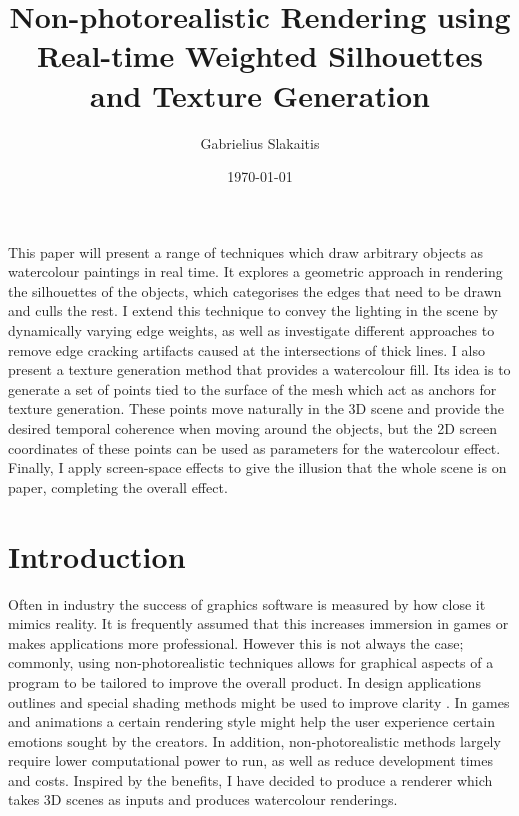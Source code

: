 \documentclass[a4paper, 12pt]{article}
\begin{document}
\title{Non-photorealistic Rendering using Real-time Weighted Silhouettes and Texture Generation}
\author{Gabrielius Slakaitis}
\date{\today}
\maketitle
\newpage

\begin{spacing}{0}
  \tableofcontents
\end{spacing}
\newpage

This paper will present a range of techniques which draw arbitrary objects as watercolour paintings in real time. It explores a geometric approach in rendering the silhouettes of the objects, which categorises the edges that need to be drawn and culls the rest. I extend this technique to convey the lighting in the scene by dynamically varying edge weights, as well as investigate different approaches to remove edge cracking artifacts caused at the intersections of thick lines. I also present a texture generation method that provides a watercolour fill. Its idea is to generate a set of points tied to the surface of the mesh which act as anchors for texture generation. These points move naturally in the 3D scene and provide the desired temporal coherence when moving around the objects, but the 2D screen coordinates of these points can be used as parameters for the watercolour effect. Finally, I apply screen-space effects to give the illusion that the whole scene is on paper, completing the overall effect.



\section{Introduction}

Often in industry the success of graphics software is measured by how close it mimics reality. It is frequently assumed that this increases immersion in games or makes applications more professional. However this is not always the case; commonly, using non-photorealistic techniques allows for graphical aspects of a program to be tailored to improve the overall product. In design applications outlines and special shading methods might be used to improve clarity \cite{Gooch1998}. In games and animations a certain rendering style might help the user experience certain emotions sought by the creators. In addition, non-photorealistic methods largely require lower computational power to run, as well as reduce development times and costs. Inspired by the benefits, I have decided to produce a renderer which takes 3D scenes as inputs and produces watercolour renderings.
\end{document}

